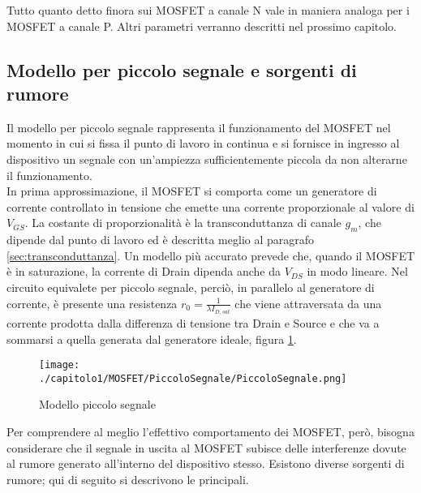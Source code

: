 Tutto quanto detto finora sui MOSFET a canale N vale in maniera analoga per i MOSFET a canale P.
Altri parametri verranno descritti nel prossimo capitolo.

\subsection{Modello per piccolo segnale e sorgenti di rumore}
Il modello per piccolo segnale rappresenta il funzionamento del MOSFET nel momento in cui si fissa il punto di lavoro in continua e si fornisce in ingresso al dispositivo un segnale con un'ampiezza sufficientemente piccola da non alterarne il funzionamento. \\

In prima approssimazione, il MOSFET si comporta come un generatore di corrente controllato in tensione che emette una corrente proporzionale al valore di $V_{GS}$. La costante di proporzionalità è la transconduttanza di canale $g_m$, che dipende dal punto di lavoro ed è descritta meglio al paragrafo \ref{sec:transconduttanza}. Un modello più accurato prevede che, quando il MOSFET è in saturazione, la corrente di Drain dipenda anche da $V_{DS}$ in modo lineare. Nel circuito equivalete per piccolo segnale, perciò, in parallelo al generatore di corrente, è presente una resistenza $r_0 = \frac{1}{\lambda I_{D,sat}}$ che viene attraversata da una corrente prodotta dalla differenza di tensione tra Drain e Source e che va a sommarsi a quella generata dal generatore ideale, figura \ref{fig:piccolo_segnale}.

\begin{figure}[t]
  
  \centering
  \texttt{[image: ./capitolo1/MOSFET/PiccoloSegnale/PiccoloSegnale.png]}
  \caption[Modello piccolo segnale]{Modello piccolo segnale}
  \label{fig:piccolo_segnale}

\end{figure}

\vspace*{0.5cm}

Per comprendere al meglio l'effettivo comportamento dei MOSFET, però, bisogna considerare che il segnale in uscita al MOSFET subisce delle interferenze dovute al rumore generato all'interno del dispositivo stesso. Esistono diverse sorgenti di rumore; qui di seguito si descrivono le principali.

